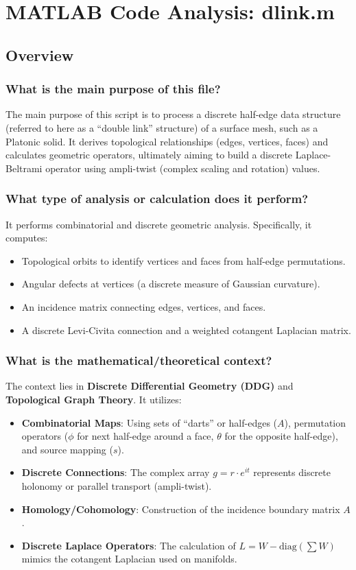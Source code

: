 

\chapter{MATLAB Code Analysis: dlink.m}
\date{}

\section*{Overview}

\subsection*{What is the main purpose of this file?}
The main purpose of this script is to process a discrete half-edge data structure (referred to here as a ``double link'' structure) of a surface mesh, such as a Platonic solid. It derives topological relationships (edges, vertices, faces) and calculates geometric operators, ultimately aiming to build a discrete Laplace-Beltrami operator using ampli-twist (complex scaling and rotation) values. 

\subsection*{What type of analysis or calculation does it perform?}
It performs combinatorial and discrete geometric analysis. Specifically, it computes:
\begin{itemize}
    \item Topological orbits to identify vertices and faces from half-edge permutations.
    \item Angular defects at vertices (a discrete measure of Gaussian curvature).
    \item An incidence matrix connecting edges, vertices, and faces.
    \item A discrete Levi-Civita connection and a weighted cotangent Laplacian matrix.
\end{itemize}

\subsection*{What is the mathematical/theoretical context?}
The context lies in \textbf{Discrete Differential Geometry (DDG)} and \textbf{Topological Graph Theory}. It utilizes:
\begin{itemize}
    \item \textbf{Combinatorial Maps}: Using sets of ``darts'' or half-edges ($A$), permutation operators ($\phi$ for next half-edge around a face, $\theta$ for the opposite half-edge), and source mapping ($s$).
    \item \textbf{Discrete Connections}: The complex array $g = r \cdot e^{it}$ represents discrete holonomy or parallel transport (ampli-twist).
    \item \textbf{Homology/Cohomology}: Construction of the incidence boundary matrix $A$.
    \item \textbf{Discrete Laplace Operators}: The calculation of $L = W - \text{diag}(\sum W)$ mimics the cotangent Laplacian used on manifolds.
\end{itemize}

